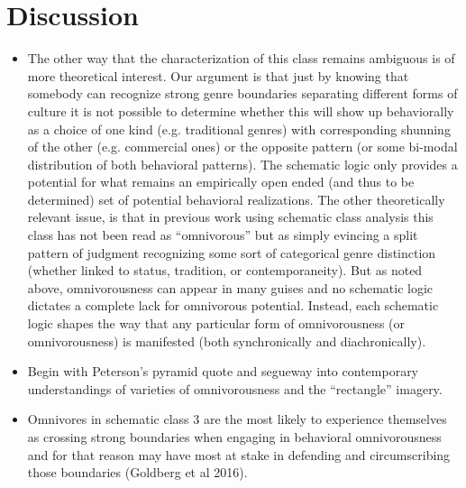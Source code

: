 \documentclass[preprint,12pt]{elsarticle}
\begin{document}
\section{Discussion}
\begin{itemize}
\item The other way that the characterization of this class remains ambiguous is of more theoretical interest. Our argument is that just by knowing that somebody can recognize strong genre boundaries separating different forms of culture it is not possible to determine whether this will show up behaviorally as a choice of one kind (e.g. traditional genres) with corresponding shunning of the other (e.g. commercial ones) or the opposite pattern (or some bi-modal distribution of both behavioral patterns). The schematic logic only provides a potential for what remains an empirically open ended (and thus to be determined) set of potential behavioral realizations. The other theoretically relevant issue, is that in previous work using schematic class analysis this class has not been read as ``omnivorous'' but as simply evincing a split pattern of judgment recognizing some sort of categorical genre distinction (whether linked to status, tradition, or contemporaneity). But as noted above, omnivorousness can appear in many guises and no schematic logic dictates a complete lack for omnivorous potential. Instead, each schematic logic shapes the way that any particular form of omnivorousness (or omnivorousness) is manifested (both synchronically and diachronically). 
\item Begin with Peterson's pyramid quote and segueway into contemporary understandings of varieties of omnivorousness and the ``rectangle'' imagery.
\item Omnivores in schematic class 3 are the most likely to experience themselves as crossing strong boundaries when engaging in behavioral omnivorousness and for that reason may have most at stake in defending and circumscribing those boundaries (Goldberg et al 2016). 
\end{itemize}



\end{document}
